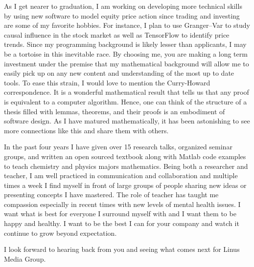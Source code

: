 \documentclass[11pt, a4paper]{awesome-cv}
\begin{document}
\begin{cvletter}
As I get nearer to graduation, I am working on developing more technical skills by using new software to model equity price action since trading and investing are some of my favorite hobbies. For instance, I plan to use Granger--Var to study causal influence in the stock market as well as TensorFlow to identify price trends. Since my programming background is likely lesser than applicants, I may be a tortoise in this inevitable race. By choosing me, you are making a long term investment under the premise that my mathematical background will allow me to easily pick up on any new content and understanding of the most up to date tools. To ease this strain, I would love to mention the Curry-Howard correspondence. It is a wonderful mathematical result that tells us that any proof is equivalent to a computer algorithm. Hence, one can think of the structure of a thesis filled with lemmas, theorems, and their proofs is an embodiment of software design. As I have matured mathematically, it has been astonishing to see more connections like this and share them with others.

In the past four years I have given over 15 research talks, organized seminar groups, and written an open sourced textbook along with Matlab code examples to teach chemistry and physics majors mathematics. Being both a researcher and teacher, I am well practiced in communication and collaboration and multiple times a week I find myself in front of large groups of people sharing new ideas or presenting concepts I have mastered. The role of teacher has taught me compassion especially in recent times with new levels of mental health issues. I want what is best for everyone I surround myself with and I want them to be happy and healthy. I want to be the best I can for your company and watch it continue to grow beyond expectation.

I look forward to hearing back from you and seeing what comes next for Linus Media Group.


\end{cvletter}

\makeletterclosing
\end{document}
